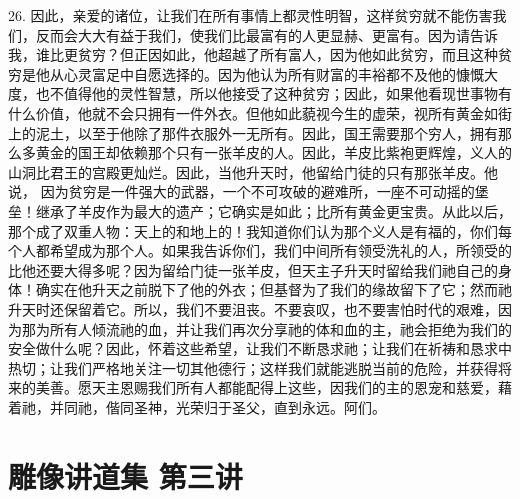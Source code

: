 26. 因此，亲爱的诸位，让我们在所有事情上都灵性明智，这样贫穷就不能伤害我们，反而会大大有益于我们，使我们比最富有的人更显赫、更富有。因为请告诉我，谁比更贫穷？但正因如此，他超越了所有富人，因为他如此贫穷，而且这种贫穷是他从心灵富足中自愿选择的。因为他认为所有财富的丰裕都不及他的慷慨大度，也不值得他的灵性智慧，所以他接受了这种贫穷；因此，如果他看现世事物有什么价值，他就不会只拥有一件外衣。但他如此藐视今生的虚荣，视所有黄金如街上的泥土，以至于他除了那件衣服外一无所有。因此，国王需要那个穷人，拥有那么多黄金的国王却依赖那个只有一张羊皮的人。因此，羊皮比紫袍更辉煌，义人的山洞比君王的宫殿更灿烂。因此，当他升天时，他留给门徒的只有那张羊皮。他说， 因为贫穷是一件强大的武器，一个不可攻破的避难所，一座不可动摇的堡垒！继承了羊皮作为最大的遗产；它确实是如此；比所有黄金更宝贵。从此以后，那个成了双重人物：天上的和地上的！我知道你们认为那个义人是有福的，你们每个人都希望成为那个人。如果我告诉你们，我们中间所有领受洗礼的人，所领受的比他还要大得多呢？因为留给门徒一张羊皮，但天主子升天时留给我们祂自己的身体！确实在他升天之前脱下了他的外衣；但基督为了我们的缘故留下了它；然而祂升天时还保留着它。所以，我们不要沮丧。不要哀叹，也不要害怕时代的艰难，因为那为所有人倾流祂的血，并让我们再次分享祂的体和血的主，祂会拒绝为我们的安全做什么呢？因此，怀着这些希望，让我们不断恳求祂；让我们在祈祷和恳求中热切；让我们严格地关注一切其他德行；这样我们就能逃脱当前的危险，并获得将来的美善。愿天主恩赐我们所有人都能配得上这些，因我们的主的恩宠和慈爱，藉着祂，并同祂，偕同圣神，光荣归于圣父，直到永远。阿们。\par



\section{雕像讲道集 第三讲}

\par

